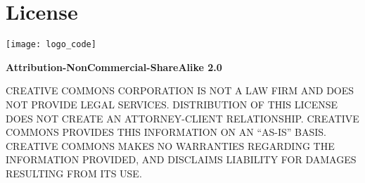 \chapter*{License}%
%

\begin{center}
\texttt{[image: logo\_code]}

\bigskip

\textbf{Attribution-NonCommercial-ShareAlike 2.0}
\end{center}

\begin{framed}
CREATIVE COMMONS CORPORATION IS NOT A LAW FIRM AND DOES NOT PROVIDE
LEGAL SERVICES. DISTRIBUTION OF THIS LICENSE DOES NOT CREATE AN
ATTORNEY-CLIENT RELATIONSHIP. CREATIVE COMMONS PROVIDES THIS
INFORMATION ON AN ``AS-IS'' BASIS. CREATIVE COMMONS MAKES NO
WARRANTIES REGARDING THE INFORMATION PROVIDED, AND DISCLAIMS LIABILITY
FOR DAMAGES RESULTING FROM ITS USE.
\end{framed}

